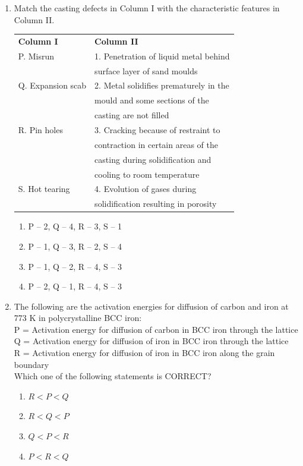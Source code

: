 \documentclass[journal]{IEEEtran}
\theoremstyle{remark}
\begin{document}
\begin{enumerate}[resume]
\item Match the casting defects in Column I with the characteristic features in Column II. \hfill{}
\begin{center}
\begin{tabular}{ll}
\textbf{Column I} & \textbf{Column II} \\
P. Misrun & 1. Penetration of liquid metal behind \\ & surface layer of sand moulds \\
Q. Expansion scab & 2. Metal solidifies prematurely in the \\ & mould and some sections of the \\ & casting are not filled \\
R. Pin holes & 3. Cracking because of restraint to \\ & contraction in certain areas of the \\ & casting during solidification and \\ & cooling to room temperature \\
S. Hot tearing & 4. Evolution of gases during \\ & solidification resulting in porosity \\
\end{tabular}
\end{center}
\begin{enumerate}
\item P – 2, Q – 4, R – 3, S – 1 
\item P – 1, Q – 3, R – 2, S – 4 
\item P – 1, Q – 2, R – 4, S – 3
\item P – 2, Q – 1, R – 4, S – 3
\end{enumerate}

\item The following are the activation energies for diffusion of carbon and iron at 773 K in polycrystalline BCC iron: \hfill{} \\
P = Activation energy for diffusion of carbon in BCC iron through the lattice \\
Q = Activation energy for diffusion of iron in BCC iron through the lattice \\
R = Activation energy for diffusion of iron in BCC iron along the grain boundary \\
Which one of the following statements is CORRECT?
\begin{multicols}{4}
\begin{enumerate}
\item $R < P < Q$
\item $R < Q < P$
\item $Q < P < R$
\item $P < R < Q$
\end{enumerate}
\end{multicols}


\end{enumerate}
\end{document}
